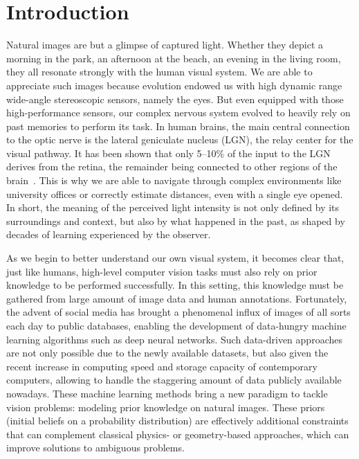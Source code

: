 \chapter*{Introduction}         %

Natural images are but a glimpse of captured light. Whether they depict a morning in the park, an afternoon at the beach, an evening in the living room, they all resonate strongly with the human visual system. We are able to appreciate such images because evolution endowed us with high dynamic range wide-angle stereoscopic sensors, namely the eyes. But even equipped with those high-performance sensors, our complex nervous system evolved to heavily rely on past memories to perform its task. In human brains, the main central connection to the optic nerve is the lateral geniculate nucleus (LGN), the relay center for the visual pathway. It has been shown that only 5--10\% of the input to the LGN derives from the retina, the remainder being connected to other regions of the brain~\cite{van2000relative}. This is why we are able to navigate through complex environments like university offices or correctly estimate distances, even with a single eye opened. In short, the meaning of the perceived light intensity is not only defined by its surroundings and context, but also by what happened in the past, as shaped by decades of learning experienced by the observer. 

As we begin to better understand our own visual system, it becomes clear that, just like humans, high-level computer vision tasks must also rely on prior knowledge to be performed successfully. In this setting, this knowledge must be gathered from large amount of image data and human annotations. Fortunately, the advent of social media has brought a phenomenal influx of images of all sorts each day to public databases, enabling the development of data-hungry machine learning algorithms such as deep neural networks. Such data-driven approaches are not only possible due to the newly available datasets, but also given the recent increase in computing speed and storage capacity of contemporary computers, allowing to handle the staggering amount of data publicly available nowadays. These machine learning methods bring a new paradigm to tackle vision problems: modeling prior knowledge on natural images. These priors (initial beliefs on a probability distribution) are effectively additional constraints that can complement classical physics- or geometry-based approaches, which can improve solutions to ambiguous problems. 

